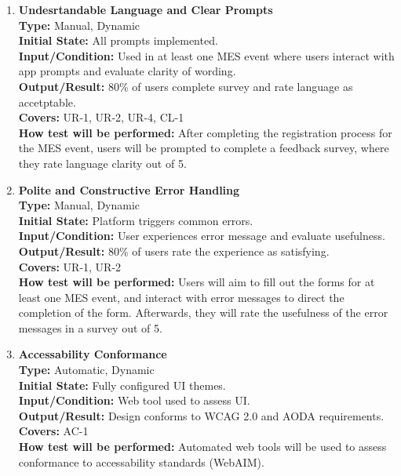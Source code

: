 \documentclass[12pt, titlepage]{article}
\begin{document}
\begin{enumerate}[label=\bfseries UH-\arabic*:, wide=0pt]
  \item \label{test-UH4} \textbf{Undesrtandable Language and Clear Prompts}\\[2mm]
    {\bf Type:} Manual, Dynamic\\
    {\bf Initial State:} All prompts implemented.\\
    {\bf Input/Condition:} Used in at least one MES event where users interact with app prompts and evaluate clarity of wording.\\
    {\bf Output/Result:} 80\% of users complete survey and rate language as accetptable.\\
    {\bf Covers:} UR-1, UR-2, UR-4, CL-1\\
    {\bf How test will be performed:} After completing the registration process for the MES event, users will be prompted to complete a feedback survey, where they rate language clarity out of 5.

  \item \label{test-UH5} \textbf{Polite and Constructive Error Handling}\\[2mm]
    {\bf Type:} Manual, Dynamic\\
    {\bf Initial State:} Platform triggers common errors.\\
    {\bf Input/Condition:} User experiences error message and evaluate usefulness.\\
    {\bf Output/Result:} 80\% of users rate the experience as satisfying.\\
    {\bf Covers:} UR-1, UR-2\\
    {\bf How test will be performed:} Users will aim to fill out the forms for at least one MES event, and interact with error messages to direct the completion of the form. Afterwards, they will rate the usefulness of the error messages in a survey out of 5.

  \item \label{test-UH6} \textbf{Accessability Conformance}\\[2mm]
    {\bf Type:} Automatic, Dynamic\\
    {\bf Initial State:} Fully configured UI themes.\\
    {\bf Input/Condition:} Web tool used to assess UI.\\
    {\bf Output/Result:} Design conforms to WCAG 2.0 and AODA requirements.\\
    {\bf Covers:} AC-1\\
    {\bf How test will be performed:} Automated web tools will be used to assess conformance to accessability standards (WebAIM).
\end{enumerate}
\end{document}
